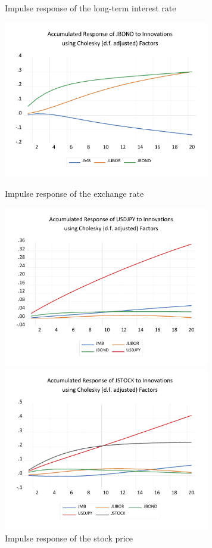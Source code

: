 \documentclass[12pt]{article}
\begin{document}
\newpage

\begin{figure}[!htbp]
    \begin{minipage}{0.5\hsize}
        \caption{Impulse response of the long-term interest rate}
        \begin{center}
            \includegraphics[width=9cm]{ijbond.pdf}
        \end{center}
    \end{minipage}
    \begin{minipage}{0.5\hsize}
        \caption{Impulse response of the exchange rate}
        \begin{center}
            \includegraphics[width=9cm]{ijrate.pdf}
        \end{center}
    \end{minipage}
    \begin{minipage}{0.5\hsize}
        \caption{Impulse response of the stock price}
        \begin{center}
            \includegraphics[width=9cm]{ijstock.pdf}

\end{center}
\end{minipage}
\end{figure}
\end{document}
